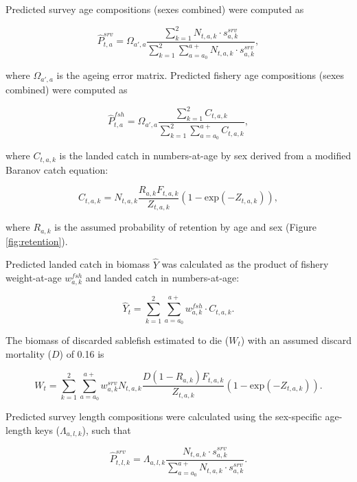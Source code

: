 \documentclass[]{article}
\begin{document}
Predicted survey age compositions (sexes combined) were computed as

\begin{equation}
\hat{P}_{t,a}^{srv}=\Omega_{a',a}\frac{\sum_{k=1}^{2}N_{t,a,k} \cdot s_{a,k}^{srv}}{\sum_{k=1}^{2}\sum_{a=a_0}^{a+} N_{t,a,k} \cdot s_{a,k}^{srv}},
\label{eq:predsrvage}
\end{equation}

where \(\Omega_{a',a}\) is the ageing error matrix. Predicted fishery
age compositions (sexes combined) were computed as

\begin{equation}
\hat{P}_{t,a}^{fsh}=\Omega_{a',a}\frac{\sum_{k=1}^{2}C_{t,a,k}}{\sum_{k=1}^{2}\sum_{a=a_0}^{a+} C_{t,a,k}},
\label{eq:predfshage}
\end{equation}

where \(C_{t,a,k}\) is the landed catch in numbers-at-age by sex derived
from a modified Baranov catch equation:

\begin{equation}
C_{t,a,k}=N_{t,a,k}\frac{R_{a,k}F_{t,a,k}}{Z_{t,a,k}}(1-\mbox{exp}(-Z_{t,a,k})),
\label{eq:landed}
\end{equation}

where \(R_{a,k}\) is the assumed probability of retention by age and sex
(Figure \ref{fig:retention}).

Predicted landed catch in biomass \(\hat{Y}\) was calculated as the
product of fishery weight-at-age \(w_{a,k}^{fsh}\) and landed catch in
numbers-at-age:

\begin{equation}
\hat{Y}_t=\sum_{k=1}^{2}\sum_{a=a_0}^{a+} w_{a,k}^{fsh} \cdot C_{t,a,k}.
\label{eq:yield}
\end{equation}

The biomass of discarded sablefish estimated to die (\(W_t\)) with an
assumed discard mortality (\(D\)) of 0.16 is

\begin{equation}
W_t= \sum_{k=1}^{2}\sum_{a=a_0}^{a+}w_{a,k}^{srv}N_{t,a,k}\frac{D (1-R_{a,k})F_{t,a,k}}{Z_{t,a,k}}(1-\mbox{exp}(-Z_{t,a,k})).
\label{eq:wastage}
\end{equation}

Predicted survey length compositions were calculated using the
sex-specific age-length keys (\(\Lambda_{a,l,k}\)), such that

\begin{equation}
\hat{P}_{t,l,k}^{srv}=\Lambda_{a,l,k}\frac{N_{t,a,k} \cdot s_{a,k}^{srv}}{\sum_{a=a_0}^{a+} N_{t,a,k} \cdot s_{a,k}^{srv}}.
\label{eq:predsrvlen}
\end{equation}
\end{document}
